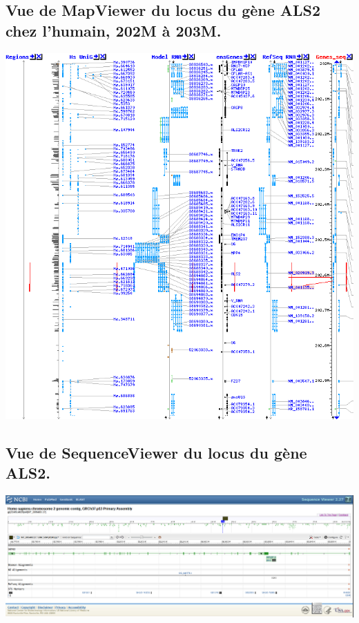 \documentclass[11pt]{article} %
\begin{document}
\subsection{Vue de MapViewer du locus du gène ALS2 chez l'humain, 202M à 203M.}\label{5}
\includegraphics[width=\linewidth]{annexes/annexe1b_mapviewer_202M-203M.png}

\subsection{Vue de SequenceViewer du locus du gène ALS2.}\label{6}
\includegraphics[width=\linewidth]{annexes/annexe1_c_sw.png}
\end{document}
